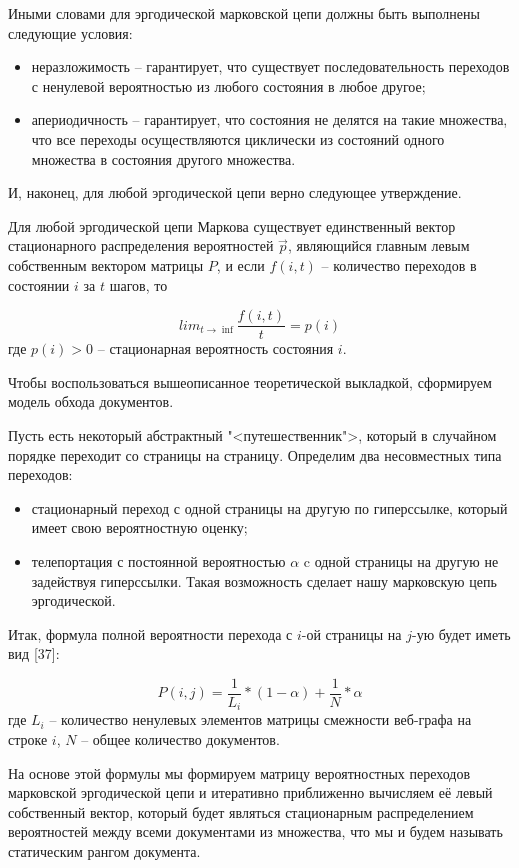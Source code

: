 Иными словами для эргодической марковской цепи должны быть выполнены следующие условия:
\begin{itemize}
\item неразложимость -- гарантирует, что существует последовательность переходов с ненулевой вероятностью из любого состояния в любое другое;
\item апериодичность -- гарантирует, что состояния не делятся на такие множества, что все переходы осуществляются циклически из состояний одного множества в состояния другого множества.
\end{itemize}

И, наконец, для любой эргодической цепи верно следующее утверждение.

Для любой эргодической цепи Маркова существует единственный вектор стационарного распределения вероятностей $\vec{p}$, являющийся главным левым собственным вектором матрицы $P$, и если $f(i, t)$ -- количество переходов в состоянии $i$ за $t$ шагов, то 

\begin{equation}
lim_{t \to \inf}\frac{f(i, t)}{t}=p(i)
\end{equation} где $p(i) > 0$ -- стационарная вероятность состояния $i$.

Чтобы воспользоваться вышеописанное теоретической выкладкой, сформируем модель обхода документов.

Пусть есть некоторый абстрактный "<путешественник">, который в случайном порядке переходит со страницы на страницу.
Определим два несовместных типа переходов:
\begin{itemize}
\item стационарный переход с одной страницы на другую по гиперссылке, который имеет свою вероятностную оценку;
\item телепортация с постоянной вероятностью $\alpha$ c одной страницы на другую не задействуя гиперссылки. Такая возможность сделает нашу марковскую цепь эргодической.
\end{itemize}

Итак, формула полной вероятности перехода с $i$-ой страницы на $j$-ую будет иметь вид [37]:

\begin{equation}
P(i, j) = \frac{1}{L_i} * (1 - \alpha) + \frac{1}{N} * \alpha
\end{equation} где $L_i$ -- количество ненулевых элементов матрицы смежности веб-графа на строке $i$, $N$ -- общее количество документов.

На основе этой формулы мы формируем матрицу вероятностных переходов марковской эргодической цепи и итеративно приближенно вычисляем её левый собственный вектор, который будет являться стационарным распределением вероятностей между всеми документами из множества, что мы и будем называть статическим рангом документа.


